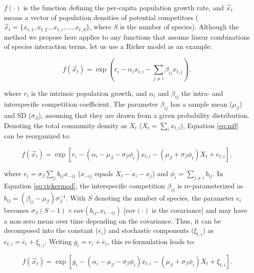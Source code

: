 \documentclass[12pt, class=article, crop=false]{standalone}
\begin{document}
$f(\cdot)$ is the function defining the per-capita population growth rate, and $\overset{\rightarrow}{x}_{t}$ means a vector of population densities of potential competitors ($\overset{\rightarrow}{x}_{t} = \{x_{t,1}, x_{t,2}...x_{t,i},...,x_{t,S}\}$, where $S$ is the number of species).
Although the method we propose here applies to any functions that assume linear combinations of species interaction terms, let us use a Ricker model as an example:

\begin{equation}
\label{eq:ricker}
f(\overset{\rightarrow}{x}_{t}) = \exp(r_i - \alpha_i x_{t,i} - \sum_{j \ne i} \beta_{ij} x_{t,j}),
\end{equation}

where $r_i$ is the intrinsic population growth, and $\alpha_{i}$ and $\beta_{ij}$ the intra- and interspecific competition coefficient.
The parameter $\beta_{ij}$ has a sample mean ($\mu_{\beta}$) and SD ($\sigma_{\beta}$), assuming that they are drawn from a given probability distribution. 
Denoting the total community density as $X_t$ ($X_t = \sum_i x_{t,i}$), Equation \ref{eq:m0} can be reorganized to:

\begin{equation}
\label{eq:rickermod}
f(\overset{\rightarrow}{x}_{t}) = \exp\left[r_i - (\alpha_i - \mu_{\beta} - \sigma_{\beta} \phi_i) x_{t,i} - (\mu_{\beta} +  \sigma_{\beta} \phi_i) X_t + e_{t,i} \right],
\end{equation}

where $e_i = \sigma_{\beta} \sum_{j} b_{ij} x_{-ij}$ ($x_{-ij}$ equals $X_t - x_i - x_j$) and $\phi_i = \sum_{j \ne i} b_{ij}$.
In Equation \ref{eq:rickermod}, the interspecific competition $\beta_{ij}$ is re-parameterized as $b_{ij} = (\beta_{ij} - \mu_{\beta}) \sigma_{\beta}^{-1}$.
With $S$ denoting the number of species, the parameter $e_i$ becomes $\sigma_{\beta}(S - 1) \times \mbox{cov} (b_{ij}, x_{t,-ij})$ [$\mbox{cov}(\cdot)$ is the covariance] and may have a non-zero mean over time depending on the covariance.
Thus, it can be decomposed into the constant ($\overline{e}_i$) and stochastic components ($\xi_{t,i}$) as $e_{t,i} = \overline{e}_i + \xi_{t,i}$.
Writing $g_{i} = r_i + \overline{e}_i$, this re-formulation leads to:

\begin{equation}
    f(\overset{\rightarrow}{x}_{t}) = \exp\left[g_{i} - (\alpha_i - \mu_{\beta} - \sigma_{\beta} \phi_i) x_{t,i} - (\mu_{\beta} +  \sigma_{\beta} \phi_i) X_t + \xi_{t,i} \right].
\end{equation}
\end{document}
